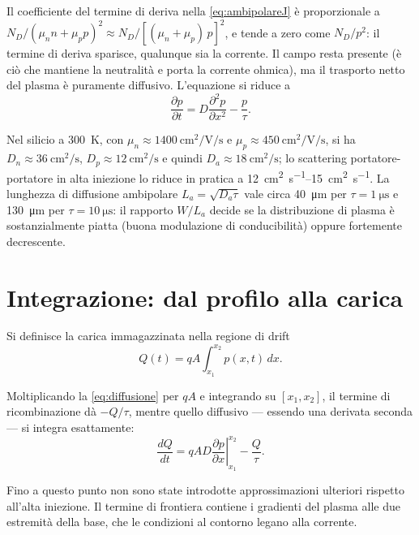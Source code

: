 \documentclass[11pt,a4paper]{article}
\newcommand{\dpar}[2]{\frac{\partial #1}{\partial #2}}
\newcommand{\dparq}[2]{\frac{\partial^2 #1}{\partial #2^2}}
\begin{document}
Il coefficiente del termine di deriva nella \eqref{eq:ambipolareJ} \`e proporzionale a
$N_D/(\mu_n n + \mu_p p)^2 \approx N_D/[(\mu_n+\mu_p)\,p]^2$, e tende a zero come
$N_D/p^2$: il termine di deriva sparisce, qualunque sia la corrente. Il campo resta
presente (\`e ci\`o che mantiene la neutralit\`a e porta la corrente ohmica), ma il
trasporto netto del plasma \`e puramente diffusivo. L'equazione si riduce a
\begin{equation}
  \dpar{p}{t} = D \dparq{p}{x} - \frac{p}{\tau} .
  \label{eq:diffusione}
\end{equation}

Nel silicio a \SI{300}{\kelvin}, con $\mu_n \approx \SI{1400}{\centi\meter\squared\per\volt\per\second}$
e $\mu_p \approx \SI{450}{\centi\meter\squared\per\volt\per\second}$, si ha
$D_n \approx \SI{36}{\centi\meter\squared\per\second}$,
$D_p \approx \SI{12}{\centi\meter\squared\per\second}$ e quindi
$D_a \approx \SI{18}{\centi\meter\squared\per\second}$; lo scattering portatore-portatore
in alta iniezione lo riduce in pratica a \SIrange{12}{15}{\centi\meter\squared\per\second}.
La lunghezza di diffusione ambipolare $L_a = \sqrt{D_a \tau}$ vale circa
\SI{40}{\micro\meter} per $\tau = \SI{1}{\micro\second}$ e \SI{130}{\micro\meter} per
$\tau = \SI{10}{\micro\second}$: il rapporto $W/L_a$ decide se la distribuzione di
plasma \`e sostanzialmente piatta (buona modulazione di conducibilit\`a) oppure
fortemente decrescente.

\section{Integrazione: dal profilo alla carica}

Si definisce la carica immagazzinata nella regione di drift
\begin{equation}
  Q(t) = qA \int_{x_1}^{x_2} p(x,t)\, dx .
\end{equation}

Moltiplicando la \eqref{eq:diffusione} per $qA$ e integrando su $[x_1,x_2]$, il termine
di ricombinazione d\`a $-Q/\tau$, mentre quello diffusivo --- essendo una derivata
seconda --- si integra esattamente:
\begin{equation}
  \frac{dQ}{dt}
  = qAD \left.\dpar{p}{x}\right|_{x_1}^{x_2} - \frac{Q}{\tau}.
  \label{eq:integrata}
\end{equation}

Fino a questo punto non sono state introdotte approssimazioni ulteriori rispetto
all'alta iniezione. Il termine di frontiera contiene i gradienti del plasma alle due
estremit\`a della base, che le condizioni al contorno legano alla corrente.
\end{document}
